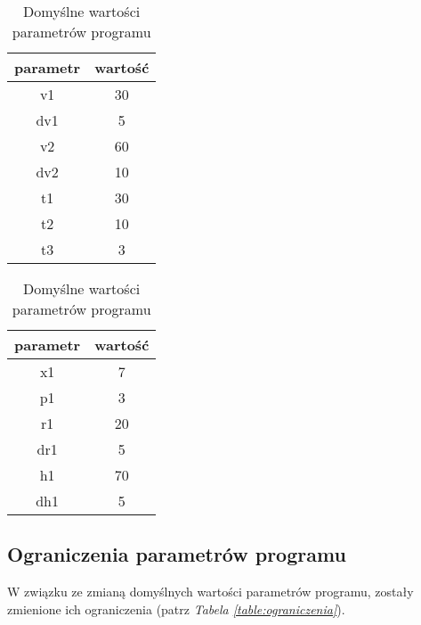 \documentclass[a4paper]{article}
\begin{document}
\begin{table}[ht]
\centering
    \renewcommand{\arraystretch}{1.3}
    \begin{tabular}{|c|c|}
    \rowcolor{lightgray}
        \hline
        parametr&warto\'s\'c \\
        \hline
        v1&30\\
        \hline
        dv1&5\\
        \hline
        v2&60\\
        \hline
        dv2&10\\
        \hline
        t1&30\\
        \hline
        t2&10\\
        \hline
        t3&3\\
        \hline
\end{tabular}
\quad
    \begin{tabular}{|c|c|}
    \rowcolor{lightgray}
        \hline 
        parametr&warto\'s\'c\\
        \hline
        x1&7\\ 
        \hline
        p1&3\\
        \hline
        r1&20\\
        \hline
        dr1&5\\
        \hline
        h1&70\\
        \hline
        dh1&5\\
        \hline
\end{tabular}
\color{lightgray}\caption{Domy\'slne warto\'sci parametr\'ow programu}
\label{table:ta}
\end{table}

\subsection{Ograniczenia parametr\'ow programu}
\quad W zwi\k{a}zku ze zmian\k{a} domy\'slnych warto\'sci parametr\'ow programu, zosta\l{}y zmienione ich ograniczenia (patrz \textit{Tabela \ref{table:ograniczenia}}).
\end{document}
